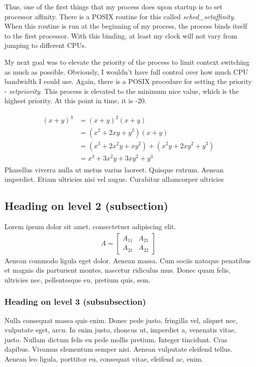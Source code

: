 \documentclass[paper=a4, fontsize=11pt]{scrartcl}
\numberwithin{equation}{section}		%
\numberwithin{figure}{section}			%
\numberwithin{table}{section}				%
\begin{document}
Thus, one of the first things that my process does upon startup is to set processor affinity.  There is a POSIX routine for this called \textit{sched\_setaffinity}.  When this routine is run at the beginning of my process, the process binds itself to the first processor.  With this binding, at least my clock will not vary from jumping to different CPUs.

My next goal was to elevate the priority of the process to limit context switching as much as possible.  Obviously, I wouldn't have full control over how much CPU bandwidth I could use.  Again, there is a POSIX procedure for setting the priority - \textit{setpriority}.  This process is elevated to the minimum nice value, which is the highest priority.  At this point in time, it is -20.

\begin{align} 
	\begin{split}
	(x+y)^3 	&= (x+y)^2(x+y)\\
					&=(x^2+2xy+y^2)(x+y)\\
					&=(x^3+2x^2y+xy^2) + (x^2y+2xy^2+y^3)\\
					&=x^3+3x^2y+3xy^2+y^3
	\end{split}					
\end{align}
Phasellus viverra nulla ut metus varius laoreet. Quisque rutrum. Aenean imperdiet. Etiam ultricies nisi vel augue. Curabitur ullamcorper ultricies 

\subsection{Heading on level 2 (subsection)}
Lorem ipsum dolor sit amet, consectetuer adipiscing elit. 
\begin{align}
	A = 
	\begin{bmatrix}
	A_{11} & A_{21} \\
  	A_{21} & A_{22}
	\end{bmatrix}
\end{align}
Aenean commodo ligula eget dolor. Aenean massa. Cum sociis natoque penatibus et magnis dis parturient montes, nascetur ridiculus mus. Donec quam felis, ultricies nec, pellentesque eu, pretium quis, sem.

\subsubsection{Heading on level 3 (subsubsection)}
Nulla consequat massa quis enim. Donec pede justo, fringilla vel, aliquet nec, vulputate eget, arcu. In enim justo, rhoncus ut, imperdiet a, venenatis vitae, justo. Nullam dictum felis eu pede mollis pretium. Integer tincidunt. Cras dapibus. Vivamus elementum semper nisi. Aenean vulputate eleifend tellus. Aenean leo ligula, porttitor eu, consequat vitae, eleifend ac, enim.
\end{document}
